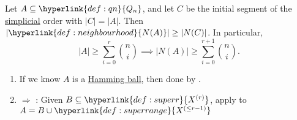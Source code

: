 \documentclass{article}
\let\subset\subseteq
\begin{document}
\begin{nthm}\label{thm:harper1}
  Let $A \subset \hyperlink{def:qn}{Q_n}$, and let $C$ be the initial segment of the \hyperlink{def:simplicial}{simplicial} order with $|C| = |A|$.
  Then $|\hyperlink{def:neighbourhood}{N(A)}| \geq |N(C)|$.
  In particular,
  \begin{equation*}|A| \geq \sum_{i=0}^r \binom{n}{i} \implies
  |N(A)| \geq \sum_{i=0}^{r+1} \binom{n}{i}.\end{equation*}
\end{nthm}
\begin{remark}\leavevmode
  \begin{enumerate}[label=\arabic*.]
    \item If we know $A$ is a \hyperlink{def:hamming}{Hamming ball}, then done by .
    \item {} $\Rightarrow$ : Given $B \subset \hyperlink{def:superr}{X^{(r)}}$, apply  to $A = B \cup \hyperlink{def:superrange}{X^{(\leq r-1)}}$
  \end{enumerate}
\end{remark}
\end{document}
